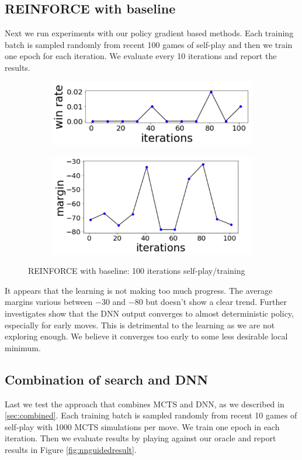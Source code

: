 \documentclass{article}
\begin{document}
\subsection{REINFORCE with baseline}
Next we run experiments with our policy gradient based methods. Each training batch is sampled randomly from recent 100 games of self-play and then we train one epoch for each iteration. We evaluate every 10 iterations and report the results. 

\begin{figure}[ht]
\centering
\begin{subfigure}{.5\textwidth}
\centering
\includegraphics[width=0.9\linewidth]{pgwinrate}
\end{subfigure}%
\begin{subfigure}{.5\textwidth}
\centering
\centering
\includegraphics[width=0.9\linewidth]{pgmargin}
\end{subfigure}
\caption{REINFORCE with baseline: 100 iterations self-play/training}
\label{fig:pgwinrate}
\end{figure}

It appears that the learning is not making too much progress. The average margins various between $-30$ and $-80$ but doesn't show a clear trend. Further investigates show that the DNN output converges to almost deterministic policy, especially for early moves. This is detrimental to the learning as we are not exploring enough. We believe it converges too early to some less desirable local minimum.


\subsection{Combination of search and DNN}
Last we test the approach that combines MCTS and DNN, as we described in \ref{sec:combined}. Each training batch is sampled randomly from recent 10 games of self-play with 1000 MCTS simulations per move. We train one epoch in each iteration. Then we evaluate results by playing against our oracle and report results in Figure \ref{fig:nnguidedresult}.
\end{document}

